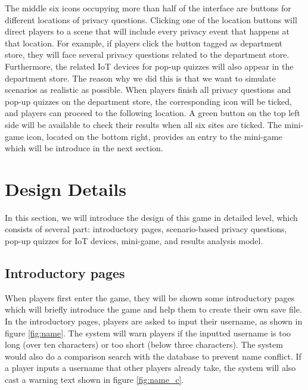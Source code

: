\documentclass[msc,deptreport,ai]{infthesis}      %
\begin{document}
The middle six icons occupying more than half of the interface are buttons for different locations of privacy questions. Clicking one of the location buttons will direct players to a scene that will include every privacy event that happens at that location. For example, if players click the button tagged as department store, they will face several privacy questions related to the department store. Furthermore, the related IoT devices for pop-up quizzes will also appear in the department store. The reason why we did this is that we want to simulate scenarios as realistic as possible. When players finish all privacy questions and pop-up quizzes on the department store, the corresponding icon will be ticked, and players can proceed to the following location. A green button on the top left side will be available to check their results when all six sites are ticked. The mini-game icon, located on the bottom right, provides an entry to the mini-game which will be introduce in the next section.

\section{Design Details}

In this section, we will introduce the design of this game in detailed level, which consists of several part: introductory pages,  scenario-based privacy questions, pop-up quizzes for IoT devices, mini-game, and results analysis model.

\subsection{Introductory pages}
\label{section:intro}

When players first enter the game, they will be shown some introductory pages which will briefly introduce the game and help them to create their own save file. In the introductory pages, players are asked to input their username, as shown in figure \ref{fig:name}. The system will warn players if the inputted username is too long (over ten characters) or too short (below three characters). The system would also do a comparison search with the database to prevent name conflict. If a player inputs a username that other players already take, the system will also cast a warning text shown in figure \ref{fig:name_c}. 
\end{document}
